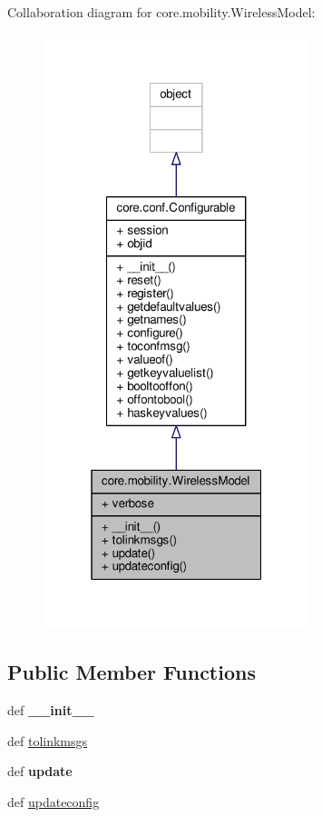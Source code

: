Collaboration diagram for core.\+mobility.\+Wireless\+Model\+:
\nopagebreak
\begin{figure}[H]
\begin{center}
\leavevmode
\includegraphics[width=220pt]{classcore_1_1mobility_1_1_wireless_model__coll__graph}
\end{center}
\end{figure}
\subsection*{Public Member Functions}
\begin{DoxyCompactItemize}
\item 
\hypertarget{classcore_1_1mobility_1_1_wireless_model_ad06a4810d8aa4182bbad093d72e87c2f}{def {\bfseries \+\_\+\+\_\+init\+\_\+\+\_\+}}\label{classcore_1_1mobility_1_1_wireless_model_ad06a4810d8aa4182bbad093d72e87c2f}

\item 
def \hyperlink{classcore_1_1mobility_1_1_wireless_model_a14b1dfe0c9f10e0f5fb600cbaab714c8}{tolinkmsgs}
\item 
\hypertarget{classcore_1_1mobility_1_1_wireless_model_a6001143b2d468a631e130ea03c39d2d9}{def {\bfseries update}}\label{classcore_1_1mobility_1_1_wireless_model_a6001143b2d468a631e130ea03c39d2d9}

\item 
def \hyperlink{classcore_1_1mobility_1_1_wireless_model_a7152431eefa788386d36cefc5817c3c0}{updateconfig}
\end{DoxyCompactItemize}
